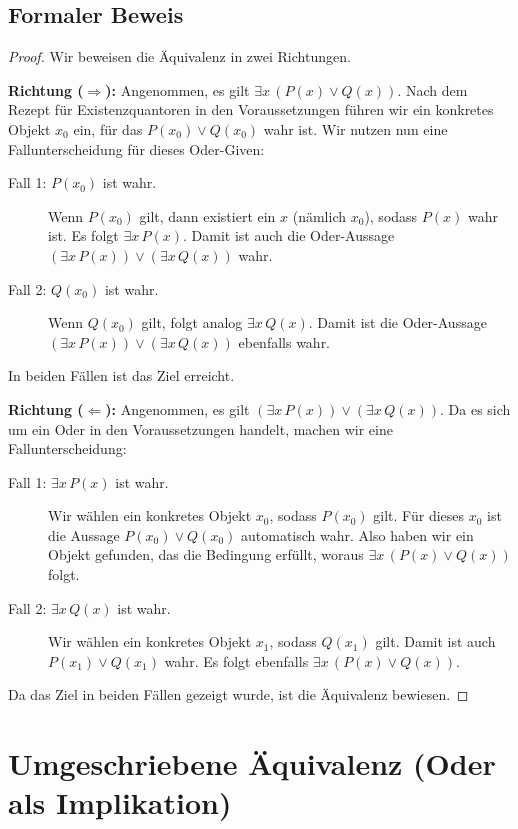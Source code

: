 \documentclass{article}
\begin{document}
\subsection*{Formaler Beweis}
\begin{proof}
Wir beweisen die Äquivalenz in zwei Richtungen.

\noindent
\textbf{Richtung ($\Rightarrow$):} Angenommen, es gilt $\exists x \, (P(x) \lor Q(x))$. Nach dem Rezept für Existenzquantoren in den Voraussetzungen führen wir ein konkretes Objekt $x_0$ ein, für das $P(x_0) \lor Q(x_0)$ wahr ist. Wir nutzen nun eine Fallunterscheidung für dieses Oder-Given:
\begin{description}
    \item[Fall 1: $P(x_0)$ ist wahr.] Wenn $P(x_0)$ gilt, dann existiert ein $x$ (nämlich $x_0$), sodass $P(x)$ wahr ist. Es folgt $\exists x \, P(x)$. Damit ist auch die Oder-Aussage $(\exists x \, P(x)) \lor (\exists x \, Q(x))$ wahr.
    \item[Fall 2: $Q(x_0)$ ist wahr.] Wenn $Q(x_0)$ gilt, folgt analog $\exists x \, Q(x)$. Damit ist die Oder-Aussage $(\exists x \, P(x)) \lor (\exists x \, Q(x))$ ebenfalls wahr.
\end{description}
In beiden Fällen ist das Ziel erreicht.

\medskip
\noindent
\textbf{Richtung ($\Leftarrow$):} Angenommen, es gilt $(\exists x \, P(x)) \lor (\exists x \, Q(x))$. Da es sich um ein Oder in den Voraussetzungen handelt, machen wir eine Fallunterscheidung:
\begin{description}
    \item[Fall 1: $\exists x \, P(x)$ ist wahr.] Wir wählen ein konkretes Objekt $x_0$, sodass $P(x_0)$ gilt. Für dieses $x_0$ ist die Aussage $P(x_0) \lor Q(x_0)$ automatisch wahr. Also haben wir ein Objekt gefunden, das die Bedingung erfüllt, woraus $\exists x \, (P(x) \lor Q(x))$ folgt.
    \item[Fall 2: $\exists x \, Q(x)$ ist wahr.] Wir wählen ein konkretes Objekt $x_1$, sodass $Q(x_1)$ gilt. Damit ist auch $P(x_1) \lor Q(x_1)$ wahr. Es folgt ebenfalls $\exists x \, (P(x) \lor Q(x))$.
\end{description}
Da das Ziel in beiden Fällen gezeigt wurde, ist die Äquivalenz bewiesen.
\end{proof}

\newpage

\section*{Umgeschriebene Äquivalenz (Oder als Implikation)}
\end{document}
